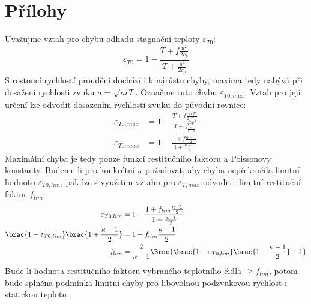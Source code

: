 \section*{Přílohy}
 \label{priloha:odvozeni-limitniho-f}
    Uvažujme vztah pro chybu odhadu stagnační teploty $\varepsilon _{T0}$:
    \begin{equation*}
        \varepsilon _{T0} = 1 - \frac{T + f \frac{u^2}{2 c_p}}{T + \frac{u^2}{2 c_p}}
    \end{equation*}
    \noindent S rostoucí rychlostí proudění dochází i k nárůstu chyby, maxima tedy nabývá při dosažení rychlosti zvuku $a = \sqrt{\kappa r T}$. Označme tuto chybu $\varepsilon _{T0,max}$. Vztah pro její určení lze odvodit dosazením rychlosti zvuku do původní rovnice:
    \begin{align*}
        \varepsilon _{T0,max} &= 1 - \frac{T + f \frac{\kappa r T}{2 \frac{\kappa r}{\kappa - 1}}}{T + \frac{\kappa r T}{2 \frac{\kappa r}{\kappa - 1}}} \\
        \varepsilon _{T0,max} &= 1 - \frac{1 + f \frac{\kappa - 1}{2}}{1 + \frac{\kappa - 1}{2}}
    \end{align*}
    \noindent Maximální chyba je tedy pouze funkcí restitučního faktoru a Poissonovy konstanty. Budeme-li pro konkrétní $\kappa$ požadovat, aby chyba nepřekročila limitní hodnotu $\varepsilon _{T0,lim}$, pak lze s využitím vztahu pro $\varepsilon _{T,max}$ odvodit i limitní restituční faktor $f_{lim}$:
    \begin{align*}
        \varepsilon _{T0,lim} &= 1 - \frac{1 + f_{lim} \frac{\kappa - 1}{2}}{1 + \frac{\kappa - 1}{2}} \\
        \brac{1 - \varepsilon _{T0,lim}} \brac{1 + \frac{\kappa - 1}{2}} &= 1 + f_{lim} \frac{\kappa - 1}{2} \\
        f_{lim} &= \frac{2}{\kappa - 1} \Brac{\brac{1 - \varepsilon _{T0,lim}} \brac{1 + \frac{\kappa - 1}{2}} - 1}
    \end{align*}
    \noindent Bude-li hodnota restitučního faktoru vybraného teplotního čidla $\geq f_{lim}$, potom bude splněna podmínka limitní chyby pro libovolnou podzvukovou rychlost i statickou teplotu.
    \newpage

